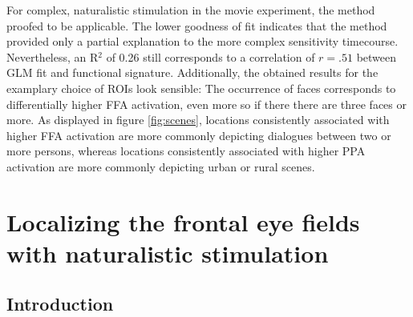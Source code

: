 \documentclass[a4paper, 12pt]{scrreprt}
\begin{document}
For complex, naturalistic stimulation in the movie experiment, the method proofed to be applicable. The lower goodness of fit indicates that the method provided only a partial explanation to the more complex sensitivity timecourse. Nevertheless, an R$^2$ of 0.26 still corresponds to a correlation of $r = .51$ between GLM fit and functional signature. Additionally, the obtained results for the examplary choice of ROIs look sensible: The occurrence of faces corresponds to differentially higher FFA activation, even more so if there there are three faces or more. As displayed in figure \ref{fig:scenes}, locations consistently associated with higher FFA activation are more commonly depicting dialogues between two or more persons, whereas locations consistently associated with higher PPA activation are more commonly depicting urban or rural scenes.




\chapter{Localizing the frontal eye fields with naturalistic stimulation}\label{c2}
\section{Introduction}
\end{document}
